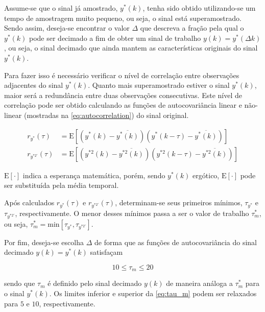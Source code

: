 \begin{apendicesenv}
Assume-se que o sinal já amostrado, $y^*(k)$, tenha sido obtido utilizando-se um tempo
de amostragem muito pequeno, ou seja, o sinal está superamostrado. Sendo assim, deseja-se encontrar o
valor $\Delta$ que descreva a fração pela qual o $y^*(k)$ pode ser decimado a fim de obter um sinal de trabalho
$y(k) = y^*(\Delta k)$, ou seja, o sinal decimado que ainda mantem as características originais do sinal $y^*(k)$.

Para fazer isso é necessário verificar o nível de correlação entre observações adjacentes do sinal
$y^*(k)$. Quanto mais superamostrado estiver o sinal $y^*(k)$, maior será a redundância entre duas
observações consecutivas. Este nível de correlação pode ser obtido calculando as funções de
autocovariância linear e não-linear (mostradas na \cref{eq:autocorrelation}) do sinal original.

\begin{subequations}
    \label{eq:autocorrelation}
    \begin{align}
		r_{y^*}(\tau) &= \mathrm{E} \left[(y^*(k) - \overline{y^*(k)}) (y^*(k - \tau) - \overline{y^*(k)})\right]		\\
		r_{y^{*2'}}(\tau) &= \mathrm{E} \left[(y^{*2}(k) - \overline{y^{*2}(k)}) (y^{*2}(k - \tau) - \overline{y^{*2}(k)})\right]
    \end{align}
\end{subequations}

$\mathrm{E}[\cdot]$ indica a esperança matemática, porém, sendo $y^*(k)$ ergótico, $\mathrm{E}[\cdot]$
pode ser substituída pela média temporal.

Após calculados $r_{y^*}(\tau)$ e $r_{y^{*2'}}(\tau)$, determinam-se seus primeiros mínimos,
$\tau_{y^*}$ e $\tau_{y^{*2'}}$, respectivamente. O menor desses mínimos passa a ser o valor de trabalho
$\tau_{m}^{*}$, ou seja, $\tau_{m}^{*} = \mathrm{min} \left[ \tau_{y^*} , \tau_{y^{*2'}} \right]$.

Por fim, deseja-se escolha $\Delta$ de forma que as funções de autocovariância do sinal decimado $y(k) = y^*(k)$
satisfaçam

\begin{equation}
    \label{eq:tau_m}
    10 \leq \tau_m \leq 20
\end{equation}

\noindent
sendo que $\tau_m$ é definido pelo sinal decimado $y(k)$ de maneira análoga a $\tau_m^*$ para o
sinal $y^*(k)$. Os limites inferior e superior da \cref{eq:tau_m} podem ser relaxados para
$5$ e $10$, respectivamente.


\end{apendicesenv}
